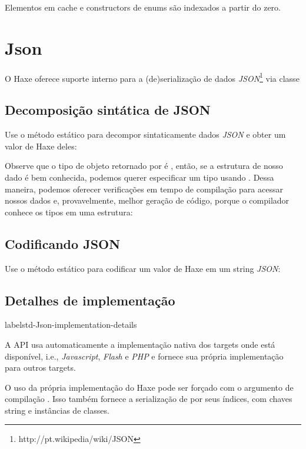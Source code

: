 {\noindent Elementos em cache e constructors de enums são indexados a partir do zero.

\section {Json}
\label{std-Json}

O Haxe oferece suporte interno para a (de)serialização de dados \emph{JSON}\footnote{http://pt.wikipedia/wiki/JSON} via classe 

\subsection{Decomposição sintática de JSON}

Use o método estático  para decompor sintaticamente dados \emph{JSON} e obter um valor de Haxe deles:


Observe que o tipo de objeto retornado por  é , então, se a estrutura de nosso dado é bem conhecida, podemos querer especificar um tipo usando . Dessa maneira, podemos oferecer verificações em tempo de compilação para acessar nossos dados e, provavelmente, melhor geração de código, porque o compilador conhece os tipos em uma estrutura:



\subsection{Codificando JSON}
\label{std-Json-encoding}

Use o método estático  para codificar um valor de Haxe em um string \emph{JSON}:


\subsection{Detalhes de implementação}
label{std-Json-implementation-details}

A API  usa automaticamente a implementação nativa dos targets onde está disponível, i.e., \emph{Javascript}, \emph{Flash} e \emph{PHP} e fornece sua própria implementação para outros targets.

O uso da própria implementação do Haxe pode ser forçado com o argumento de compilação . Isso também fornece a serialização de  por seus índices,  com chaves string e instâncias de classes.

}
